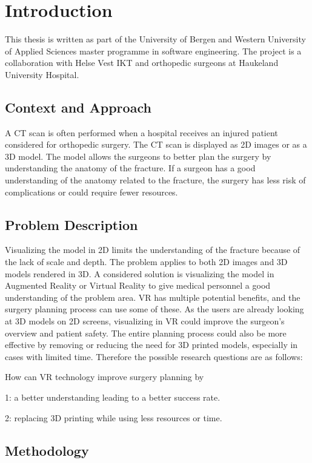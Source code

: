 \documentclass[a4paper]{report}
\begin{document}

\chapter{Introduction}
This thesis is written as part of the University of Bergen and Western University of Applied Sciences master programme in software engineering. The project is a collaboration with Helse Vest IKT and orthopedic surgeons at Haukeland University Hospital.


\section{Context and Approach}
A CT scan is often performed when a hospital receives an injured patient considered for orthopedic surgery. The CT scan is displayed as 2D images or as a 3D model. The model allows the surgeons to better plan the surgery by understanding the anatomy of the fracture.
If a surgeon has a good understanding of the anatomy related to the fracture,
the surgery has less risk of complications or could require fewer resources.

\section{Problem Description}
Visualizing the model in 2D limits the understanding of the fracture because of the lack of scale and depth. The problem applies to both 2D images and 3D models rendered in 3D.
A considered solution is visualizing the model in Augmented Reality or Virtual Reality to give medical personnel a good understanding of the problem area.
VR has multiple potential benefits, and the surgery planning process can use some of these. As the users are already looking at 3D models on 2D screens, visualizing in VR could improve the surgeon's overview and patient safety. The entire planning process could also be more effective by removing or reducing the need for 3D printed models, especially in cases with limited time. Therefore the possible research questions are as follows:

How can VR technology improve surgery planning by

1: a better understanding leading to a better success rate.

2: replacing 3D printing while using less resources or time.

\section{Methodology}
\end{document}
